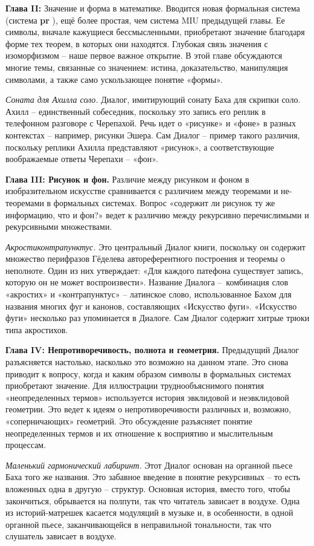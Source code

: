 \documentclass[../main.tex]{subfiles}
\begin{document}
\textbf{Глава II:}
Значение и форма в математике. Вводится новая формальная система (система \textbf{pr} ), ещё более простая, чем система MIU предыдущей главы. Ее символы, вначале кажущиеся бессмысленными, приобретают значение благодаря форме тех теорем, в которых они находятся. Глубокая связь значения с изоморфизмом \--- наше первое важное открытие. В этой главе обсуждаются многие темы, связанные со значением: истина, доказательство, манипуляция символами, а также само ускользающее понятие «формы».

\emph{Соната для Ахилла соло.}
Диалог, имитирующий сонату Баха для скрипки соло. Ахилл \--- единственный собеседник, поскольку это запись его реплик в телефонном разговоре с Черепахой. Речь идет о «рисунке» и «фоне» в разных контекстах \--- например, рисунки Эшера. Сам Диалог \--- пример такого различия, поскольку реплики Ахилла представляют «рисунок», а соответствующие воображаемые ответы Черепахи \--- «фон».

\textbf{Глава III: Рисунок и фон.}
Различие между рисунком и фоном в изобразительном искусстве сравнивается с различием между теоремами и не-теоремами в формальных системах. Вопрос «содержит ли рисунок ту же информацию, что и фон?» ведет к различию между рекурсивно перечислимыми и рекурсивными множествами.

\emph{Акростиконтрапунктус.}
Это центральный Диалог книги, поскольку он содержит множество перифразов Гёделева автореферентного построения и теоремы о неполноте. Один из них утверждает: «Для каждого патефона существует запись, которую он не может воспроизвести». Название Диалога \---~комбинация слов «акростих» и «контрапунктус» \--- латинское слово, использованное Бахом для названия многих фуг и канонов, составляющих «Искусство фуги». «Искусство фуги» несколько раз упоминается в Диалоге. Сам Диалог содержит хитрые трюки типа акростихов.

\textbf{Глава IV: Непротиворечивость, полнота и геометрия.}
Предыдущий Диалог разъясняется настолько, насколько это возможно на данном этапе. Это снова приводит к вопросу, когда и каким образом символы в формальных системах приобретают значение. Для иллюстрации труднообъяснимого понятия «неопределенных термов» используется история эвклидовой и неэвклидовой геометрии. Это ведет к идеям о непротиворечивости различных и, возможно, «соперничающих» геометрий. Это обсуждение разъясняет понятие неопределенных термов и их отношение к восприятию и мыслительным процессам.

\emph{Маленький гармонический лабиринт.}
Этот Диалог основан на органной пьесе Баха того же названия. Это забавное введение в понятие рекурсивных \--- то есть вложенных одна в другую \--- структур. Основная история, вместо того, чтобы закончиться, обрывается на полпути, так что читатель зависает в воздухе. Одна из историй-матрешек касается модуляций в музыке и, в особенности, в одной органной пьесе, заканчивающейся в неправильной тональности, так что слушатель зависает в воздухе.
\end{document}
